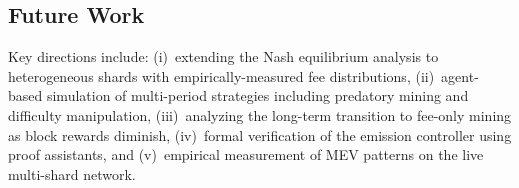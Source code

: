 \documentclass[11pt,a4paper]{article}
\theoremstyle{definition}
\theoremstyle{remark}
\begin{document}
\subsection{Future Work}

Key directions include: (i)~extending the Nash equilibrium analysis to
heterogeneous shards with empirically-measured fee distributions,
(ii)~agent-based simulation of multi-period strategies including
predatory mining and difficulty manipulation,
(iii)~analyzing the long-term transition to fee-only mining as block
rewards diminish, (iv)~formal verification of the emission controller
using proof assistants, and (v)~empirical measurement of MEV patterns
on the live multi-shard network.

\end{document}
